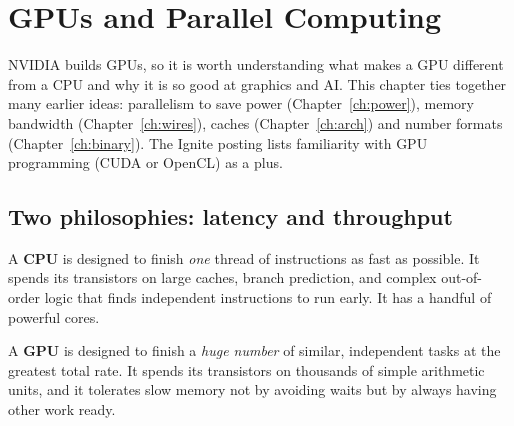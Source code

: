 \chapter{GPUs and Parallel Computing}
\label{ch:gpu}

NVIDIA builds GPUs, so it is worth understanding what makes a GPU different from a CPU and why it is so good at graphics and AI. This chapter ties together many earlier ideas: parallelism to save power (Chapter~\ref{ch:power}), memory bandwidth (Chapter~\ref{ch:wires}), caches (Chapter~\ref{ch:arch}) and number formats (Chapter~\ref{ch:binary}). The Ignite posting lists familiarity with GPU programming (CUDA or OpenCL) as a plus.

\section{Two philosophies: latency and throughput}

A \textbf{CPU} is designed to finish \emph{one} thread of instructions as fast as possible. It spends its transistors on large caches, branch prediction, and complex out-of-order logic that finds independent instructions to run early. It has a handful of powerful cores.

A \textbf{GPU} is designed to finish a \emph{huge number} of similar, independent tasks at the greatest total rate. It spends its transistors on thousands of simple arithmetic units, and it tolerates slow memory not by avoiding waits but by always having other work ready.

